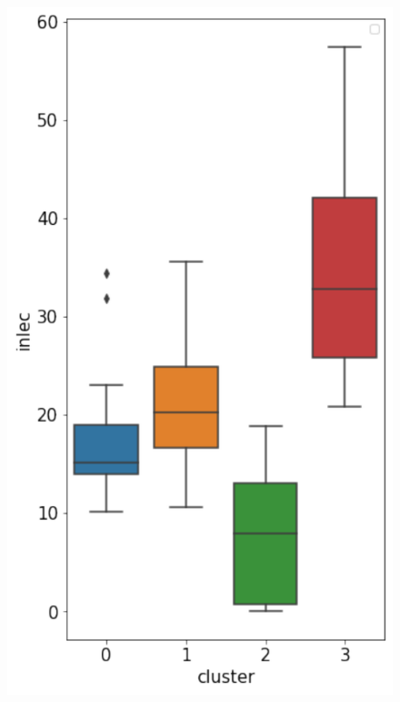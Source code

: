 \documentclass[a4paper,12pt]{ltjsreport}
\begin{document}
\begin{figure}[tbp]
  \begin{minipage}[b]{0.32\linewidth}
    \centering
    \includegraphics[keepaspectratio, scale=0.35]{inlec.pdf}
    \label{fig:inlec}
  \end{minipage}
  \begin{minipage}[b]{0.32\linewidth}
    \centering

\end{minipage}
\end{figure}
\end{document}

